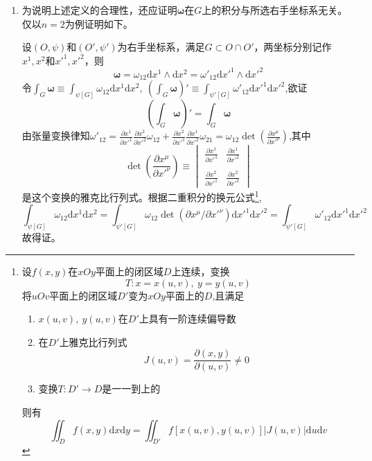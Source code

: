 \begin{note}
    \begin{enumerate}[（1）]
        \item 为说明上述定义的合理性，还应证明$\bm\omega$在$G$上的积分与所选右手坐标系无关。
        仅以$n = 2$为例证明如下。
        
        设$(O, \psi)$和$(O', \psi')$为右手坐标系，满足$G \subset O \cap O'$，两坐标分别记作$x^1, x^2$和$x'^1, x'^2$，则
        $$\bm\omega = \omega_{12}\mathrm{d}x^1 \wedge \mathrm{d}x^2 = \omega'_{12}\mathrm{d}x'^1 \wedge \mathrm{d}x'^2$$
        令$\displaystyle\int_G\bm\omega \equiv \int_{\psi[G]}\omega_{12}\mathrm{d}x^1\mathrm{d}x^2, ~ (\int_G\bm\omega)' \equiv \int_{\psi'[G]}\omega'_{12}\mathrm{d}x'^1\mathrm{d}x'^2$,欲证
        $$(\int_G\bm\omega)' = \int_G\bm\omega$$
        由张量变换律知$\omega'_{12} = \displaystyle\frac{\partial x^1}{\partial x'^1}\frac{\partial x^2}{\partial x'^2}\omega_{12} + \frac{\partial x^2}{\partial x'^1} \frac{\partial x^1}{\partial x'^2}\omega_{21} = \omega_{12}\det(\frac{\partial x^\mu}{\partial x'^\nu})$,其中
        $$\det(\frac{\partial x^\mu}{\partial x'^\nu}) \equiv \begin{vmatrix}
            \displaystyle\frac{\partial x^1}{\partial x'^1} & \displaystyle\frac{\partial x^1}{\partial x'^2} \\
            \\
            \displaystyle\frac{\partial x^2}{\partial x'^1} & \displaystyle\frac{\partial x^2}{\partial x'^2}
        \end{vmatrix}$$
        是这个变换的雅克比行列式。根据二重积分的换元公式\footnote{
            设$f(x, y)$在$xOy$平面上的闭区域$D$上连续，变换
            $$T \colon x = x(u, v), ~ y = y(u, v)$$
            将$uOv$平面上的闭区域$D'$变为$xOy$平面上的$D$,且满足
            \begin{enumerate}[（1）]
                \item $x(u, v), ~ y(u, v)$在$D'$上具有一阶连续偏导数
                \item 在$D'$上雅克比行列式
                $$J(u, v) = \frac{\partial(x, y)}{\partial(u, v)} \neq 0$$
                \item 变换$T \colon D' \to D$是一一到上的
            \end{enumerate}
            则有
            $$\iint_Df(x, y)\mathrm{d}x\mathrm{d}y = \iint_{D'}f[x(u, v), y(u, v)]|J(u,v)|\mathrm{d}u\mathrm{d}v$$
        },
        $$\int_{\psi[G]}\omega_{12}\mathrm{d}x^1\mathrm{d}x^2 = \int_{\psi'[G]}\omega_{12}\det(\partial x^\mu / \partial x'^\nu)\mathrm{d}x'^1\mathrm{d}x'^2 = \int_{\psi'[G]}\omega'_{12}\mathrm{d}x'^1\mathrm{d}x'^2$$
        故得证。


\end{enumerate}
\end{note}
